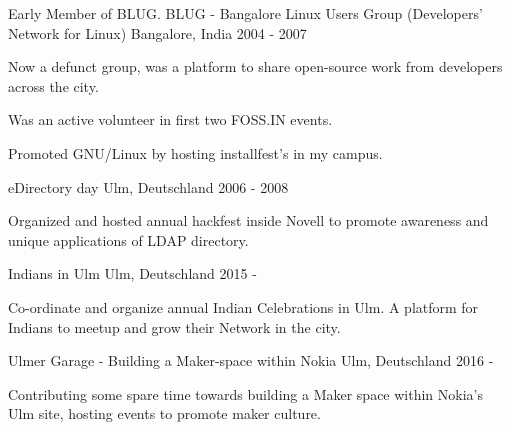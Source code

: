 

\begin{cventries}

  \cventry
    {Early Member of BLUG.} %
    {BLUG - Bangalore Linux Users Group (Developers’ Network for Linux)} %
    {Bangalore, India} %
    {2004 - 2007} %
    {
      \begin{cvitems} %
       \item {Now a defunct group, was a platform to share open-source work from developers across the city.}
       \item {Was an active volunteer in first two FOSS.IN events.}
       \item {Promoted GNU/Linux by hosting installfest's in my campus.}
      \end{cvitems}
    }

	\cventry
    {} %
    {eDirectory day} %
    {Ulm, Deutschland} %
    {2006 - 2008} %
    {
    	  \begin{cvitems}
    	    \item {Organized and hosted annual hackfest inside Novell to promote awareness and unique applications of LDAP directory.}
    	  \end{cvitems}
    }


	\cventry
    {} %
    {Indians in Ulm } %
    {Ulm, Deutschland} %
    {2015 - } %
    {
    	  \begin{cvitems}
    	    \item {Co-ordinate and organize annual Indian Celebrations in Ulm. A platform for Indians to meetup and grow their Network in the city.}
    	  \end{cvitems}
    }

	\cventry
    {} %
    {Ulmer Garage - Building a Maker-space within Nokia} %
    {Ulm, Deutschland} %
    {2016 - } %
    {
    	  \begin{cvitems}
    	    \item {Contributing some spare time towards building a Maker space within Nokia's Ulm site, hosting events to promote maker culture.}
    	  \end{cvitems}
    }

\end{cventries}

